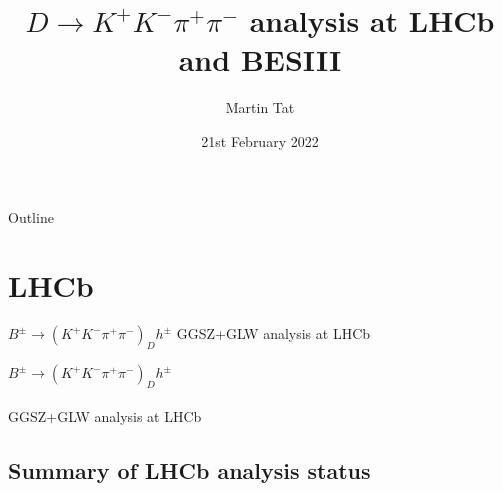 \documentclass{beamer}
\title[$K^+K^-\pi^+\pi^-$]{\texorpdfstring{$D\to K^+K^-\pi^+\pi^-$}{K+K-pi+pi-} analysis at LHCb and BESIII}
\author{Martin Tat}
\institute{Oxford LHCb}
\date{21st February 2022}
\begin{document}
\begin{frame}
  \titlepage
\end{frame}

\begin{frame}{Outline}
  \tableofcontents
\end{frame}

\section{LHCb}

\begin{frame}{$B^\pm\to(K^+K^-\pi^+\pi^-)_Dh^\pm$ GGSZ+GLW analysis at LHCb}
  \begin{center}
    {\huge $B^\pm\to(K^+K^-\pi^+\pi^-)_Dh^\pm$ \\~\\GGSZ+GLW analysis at LHCb}
  \end{center}
\end{frame}

\subsection{Summary of LHCb analysis status}
\end{document}
